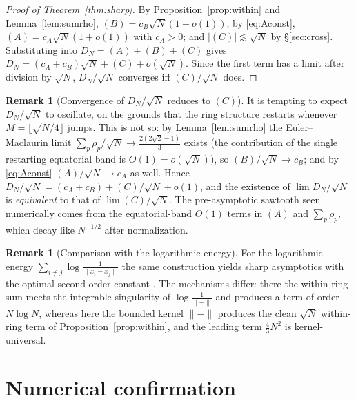 \documentclass[11pt,reqno]{amsart}
\theoremstyle{definition}
\newtheorem{remark}[theorem]{Remark}
\newcommand{\dist}[2]{\lVert #1-#2\rVert}
\newcommand{\abs}[1]{\lvert #1\rvert}
\newcommand{\Def}{D_N}
\newcommand{\rp}{\rho}
\begin{document}
\begin{proof}[Proof of Theorem~\ref{thm:sharp}]
By Proposition~\ref{prop:within} and Lemma~\ref{lem:sumrho}, $(B)=c_B\sqrt N(1+o(1))$; by
\eqref{eq:Aconst}, $(A)=c_A\sqrt N(1+o(1))$ with $c_A>0$; and $\abs{(C)}\lesssim\sqrt N$ by
\S\ref{sec:cross}. Substituting into $\Def=(A)+(B)+(C)$ gives
$\Def=(c_A+c_B)\sqrt N+(C)+o(\sqrt N)$. Since the first term has a limit after division by $\sqrt N$,
$\Def/\sqrt N$ converges iff $(C)/\sqrt N$ does.
\end{proof}

\begin{remark}[Convergence of $\Def/\sqrt N$ reduces to $(C)$]\label{rem:osc}
It is tempting to expect $\Def/\sqrt N$ to oscillate, on the grounds that the ring structure restarts
whenever $M=\lfloor\sqrt{N/4}\rfloor$ jumps. This is not so: by Lemma~\ref{lem:sumrho} the
Euler--Maclaurin limit $\sum_p\rp_p/\sqrt N\to\frac{2(2\sqrt2-1)}{3}$ exists (the contribution of the
single restarting equatorial band is $O(1)=o(\sqrt N)$), so $(B)/\sqrt N\to c_B$; and by
\eqref{eq:Aconst} $(A)/\sqrt N\to c_A$ as well. Hence
$\Def/\sqrt N=(c_A+c_B)+(C)/\sqrt N+o(1)$, and the existence of $\lim\Def/\sqrt N$ is
\emph{equivalent} to that of $\lim(C)/\sqrt N$. The pre-asymptotic sawtooth seen numerically comes
from the equatorial-band $O(1)$ terms in $(A)$ and $\sum_p\rp_p$, which decay like $N^{-1/2}$ after
normalization.
\end{remark}

\begin{remark}[Comparison with the logarithmic energy]
For the logarithmic energy $\sum_{i\ne j}\log\frac1{\dist{x_i}{x_j}}$ the same construction yields
sharp asymptotics with the optimal second-order constant \cite{BEMOC,Diamond}. The mechanisms
differ: there the within-ring sum meets the integrable singularity of $\log\frac1{\dist{}{}}$ and
produces a term of order $N\log N$, whereas here the bounded kernel $\dist{}{}$ produces the clean
$\sqrt N$ within-ring term of Proposition~\ref{prop:within}, and the leading term $\frac43N^2$ is
kernel-universal.
\end{remark}

\section{Numerical confirmation}\label{sec:numerics}
\end{document}
